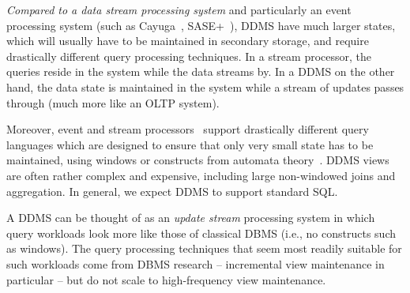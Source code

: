 {{\em Compared to a data stream processing system}\/
and particularly an event processing system (such as
Cayuga~\cite{demers-sigmod:07}, SASE+~\cite{agrawal-sigmod:08}),
%
DDMS have much larger states, which will usually have to be maintained in
secondary storage, and require drastically different query processing
techniques. In a stream processor, the queries reside in the system while the
data streams by. In a DDMS on the other hand, the data state is maintained in
the system while a stream of updates passes through (much more like an OLTP
system).

%
Moreover, event and stream processors~\cite{abadi-vldbj:03, motwani-cidr:03,
chandrasekaran-cidr:03} support drastically different query languages which are
designed to ensure that only very small state has to be maintained, using
windows or constructs from automata theory~\cite{white-pods:07}. DDMS
views are often rather complex and expensive, including large non-windowed joins
and aggregation. In general, we expect DDMS to support standard SQL.


A DDMS can be thought of as an {\em update stream}\/ processing system in which
query workloads look more like those of classical DBMS (i.e., no constructs such
as windows). The query processing techniques that seem most readily suitable for
such workloads come from DBMS research -- incremental view maintenance in
particular -- but do not scale to high-frequency view maintenance.
}


\medskip

